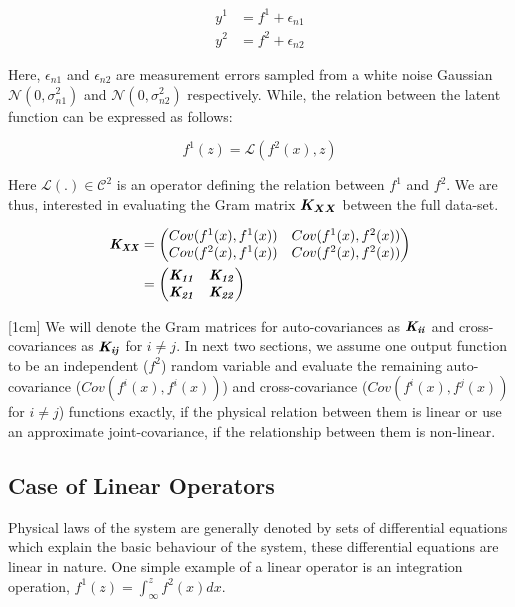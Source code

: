 \begin{align} \label{eq:relationOutputLatentCh7}
y^{1} & = f^{1} + \epsilon_{n1} \\
y^{2} & = f^{2} + \epsilon_{n2}
\end{align} 

Here, \(\epsilon_{n1}\) and \(\epsilon_{n2}\) are measurement errors sampled from a white noise Gaussian \(\mathcal{N}(0, \sigma_{n1}^2)\) and \(\mathcal{N}(0, \sigma_{n2}^2)\) respectively. While, the relation between the latent function can be expressed as follows:

\begin{equation}\label{eq:physicalRelation}
    f^{1}(z) = \mathcal{L}\left ( f^{2}(x), z \right )
\end{equation}

Here \(\mathcal{L} \left ( . \right ) \in \mathcal{C}^{2}\) is an operator defining the relation between \(f^{1}\) and \(f^{2}\). We are thus, interested in evaluating the Gram matrix $\boldsymbol{K_{XX}}$ between the full data-set. 

\begin{align}\label{eq:exactJointCovariance}
      \bm{\mathit{K_{XX}}} & =  \begin{pmatrix}
    Cov(f^1(x), f^1(x))  & Cov(f^1(x), f^2(x))\\ 
    Cov(f^2(x), f^1(x))     & Cov(f^2(x), f^2(x))
   \end{pmatrix} \\
   & = \begin{pmatrix}
    \bm{\mathit{K_{11}}}  & \bm{\mathit{K_{12}}}\\ 
    \bm{\mathit{K_{21}}}    & \bm{\mathit{K_{22}}}
   \end{pmatrix}
\end{align}

[1cm]
We will denote the Gram matrices for auto-covariances as $\bm{\mathit{K_{ii}}}$ and cross-covariances as $\bm{\mathit{K_{ij}}}$ for $i \neq j$. In next two sections, we assume one output function to be an independent ($f^2$) random variable and evaluate the remaining auto-covariance ($Cov(f^i(x), f^i(x))$) and cross-covariance ($Cov(f^i(x), f^j(x))$ for $i \neq j$) functions exactly, if the physical relation between them is linear or use an approximate joint-covariance, if the relationship between them is non-linear\cite{Constantinescu2013}.

\subsection{Case of Linear Operators}\label{subsecLinearOperators}
Physical laws of the system are generally denoted by sets of differential equations which explain the basic behaviour of the system, these differential equations are linear in nature. One simple example of a linear operator is an integration operation, $f^1(z) = \int_{\infty}^z f^2(x)dx$. 

